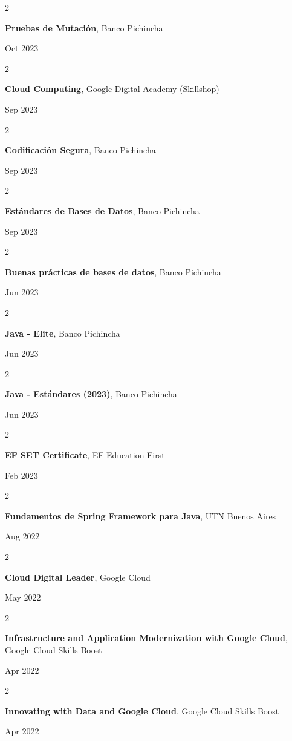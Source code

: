 \documentclass[10pt, letterpaper]{article}
\newenvironment{twocolentry}[2][]{
    \onecolentry
    \def\secondColumn{#2}
    \setcolumnwidth{\fill, 4.5 cm}
    \begin{paracol}{2}
}{
    \switchcolumn \raggedleft \secondColumn
    \end{paracol}
    \endonecolentry
} %
\begin{document}
    \begin{twocolentry}{
            Oct 2023
        }
        \textbf{Pruebas de Mutación}, Banco Pichincha
    \end{twocolentry}
    \begin{twocolentry}{
            Sep 2023
        }
        \textbf{Cloud Computing}, Google Digital Academy (Skillshop)
    \end{twocolentry}
    \begin{twocolentry}{
            Sep 2023
        }
        \textbf{Codificación Segura}, Banco Pichincha
    \end{twocolentry}
    \begin{twocolentry}{
            Sep 2023
        }
        \textbf{Estándares de Bases de Datos}, Banco Pichincha
    \end{twocolentry}
    \begin{twocolentry}{
            Jun 2023
        }
        \textbf{Buenas prácticas de bases de datos}, Banco Pichincha
    \end{twocolentry}
    \begin{twocolentry}{
            Jun 2023
        }
        \textbf{Java - Elite}, Banco Pichincha
    \end{twocolentry}
    \begin{twocolentry}{
            Jun 2023
        }
        \textbf{Java - Estándares (2023)}, Banco Pichincha
    \end{twocolentry}
    \begin{twocolentry}{
            Feb 2023
        }
        \textbf{EF SET Certificate}, EF Education First
    \end{twocolentry}
    \begin{twocolentry}{
            Aug 2022
        }
        \textbf{Fundamentos de Spring Framework para Java}, UTN Buenos Aires
    \end{twocolentry}
    \begin{twocolentry}{
            May 2022
        }
        \textbf{Cloud Digital Leader}, Google Cloud
    \end{twocolentry}
    \begin{twocolentry}{
            Apr 2022
        }
        \textbf{Infrastructure and Application Modernization with Google Cloud}, Google Cloud Skills Boost
    \end{twocolentry}
    \begin{twocolentry}{
            Apr 2022
        }
        \textbf{Innovating with Data and Google Cloud}, Google Cloud Skills Boost
    \end{twocolentry}
\end{document}

